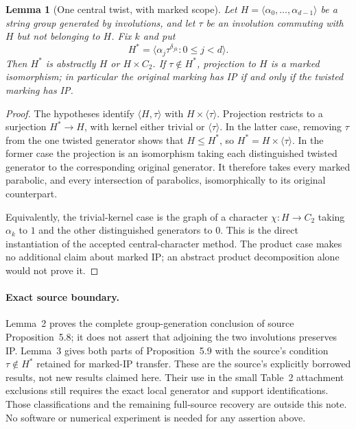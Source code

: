 \documentclass[11pt,a4paper]{article}
\newtheorem{lemma}{Lemma}
\newcommand{\gen}[1]{\langle#1\rangle}
\begin{document}
\begin{lemma}[One central twist, with marked scope]
Let $H=\gen{\alpha_0,\ldots,\alpha_{d-1}}$ be a string group
generated by involutions, and let $\tau$ be an involution commuting
with $H$ but not belonging to $H$. Fix $k$ and put
\[
 H^*=\gen{\alpha_j\tau^{\delta_{jk}}:0\leq j<d}.
\]
Then $H^*$ is abstractly $H$ or $H\times C_2$.
If $\tau\notin H^*$, projection to $H$ is a marked isomorphism;
in particular the original marking has IP if and only if the
twisted marking has IP.
\end{lemma}
\begin{proof}
The hypotheses identify $\gen{H,\tau}$ with $H\times\gen\tau$.
Projection restricts to a surjection $H^*\to H$, with kernel
either trivial or $\gen\tau$. In the latter case, removing
$\tau$ from the one twisted generator shows that $H\leq H^*$,
so $H^*=H\times\gen\tau$. In the former case the projection
is an isomorphism taking each distinguished twisted generator
to the corresponding original generator. It therefore takes
every marked parabolic, and every intersection of parabolics,
isomorphically to its original counterpart.

Equivalently, the trivial-kernel case is the graph of a
character $\chi:H\to C_2$ taking $\alpha_k$ to $1$ and the
other distinguished generators to $0$. This is the direct
instantiation of the accepted central-character method.
The product case makes no additional claim about marked IP;
an abstract product decomposition alone would not prove it.
\end{proof}

\paragraph{Exact source boundary.}
Lemma~2 proves the complete group-generation conclusion of source
Proposition~5.8; it does not assert that adjoining the two involutions
preserves IP. Lemma~3 gives both parts of Proposition~5.9 with the
source's condition $\tau\notin H^*$ retained for marked-IP transfer.
These are the source's explicitly borrowed results, not new results
claimed here. Their use in the small Table~2 attachment exclusions
still requires the exact local generator and support identifications.
Those classifications and the remaining full-source recovery are
outside this note. No software or numerical experiment is needed
for any assertion above.
\end{document}
